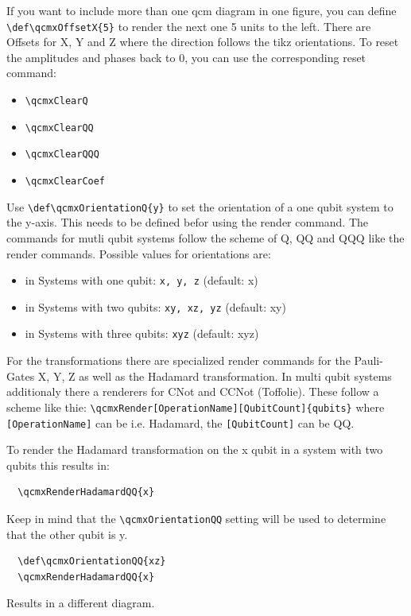 \documentclass{article}
\begin{document}
If you want to include more than one qcm diagram in one figure,
you can define \lstinline|\def\qcmxOffsetX{5}| to render the next one 5 units to the left.
There are Offsets for X, Y and Z where the direction follows the tikz orientations.
To reset the amplitudes and phases back to $0$,
you can use the corresponding reset command:
\begin{itemize}
  \item \lstinline|\qcmxClearQ|
  \item \lstinline|\qcmxClearQQ|
  \item \lstinline|\qcmxClearQQQ|
  \item \lstinline|\qcmxClearCoef|
\end{itemize}

Use \lstinline|\def\qcmxOrientationQ{y}| to set the orientation of a one qubit system to the y-axis.
This needs to be defined befor using the render command.
The commands for mutli qubit systems follow the scheme of Q, QQ and QQQ like the render commands.
Possible values for orientations are:
\begin{itemize}
  \item in Systems with one qubit: \lstinline|x, y, z| (default: x)
  \item in Systems with two qubits: \lstinline|xy, xz, yz| (default: xy)
  \item in Systems with three qubits: \lstinline|xyz| (default: xyz)
\end{itemize}

\pagebreak
For the transformations there are specialized render commands for the Pauli-Gates X, Y, Z
as well as the Hadamard transformation.
In multi qubit systems additionaly there a renderers for CNot and CCNot (Toffolie).
These follow a scheme like thie:
\lstinline|\qcmxRender[OperationName][QubitCount]{qubits}| where \lstinline|[OperationName]| can be i.e. Hadamard,
the \lstinline|[QubitCount]| can be QQ.

To render the Hadamard transformation on the x qubit in a system with two qubits this results in:
\begin{lstlisting}
  \qcmxRenderHadamardQQ{x}
\end{lstlisting}
Keep in mind that the \lstinline|\qcmxOrientationQQ| setting will be used to determine that the other qubit is y.
\begin{lstlisting}
  \def\qcmxOrientationQQ{xz}
  \qcmxRenderHadamardQQ{x}
\end{lstlisting}
Results in a different diagram.
\end{document}
